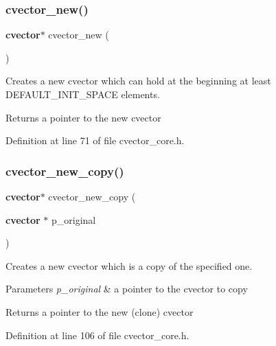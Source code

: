 \subsubsection{cvector\+\_\+new()}
{\footnotesize\ttfamily \textbf{ cvector}$\ast$ cvector\+\_\+new (\begin{DoxyParamCaption}{ }\end{DoxyParamCaption})}

Creates a new cvector which can hold at the beginning at least D\+E\+F\+A\+U\+L\+T\+\_\+\+I\+N\+I\+T\+\_\+\+S\+P\+A\+CE elements. \begin{DoxyReturn}{Returns}
a pointer to the new cvector 
\end{DoxyReturn}


Definition at line 71 of file cvector\+\_\+core.\+h.

\mbox{\label{cvector__interface_8h_a5106edfcb490caa0a6eb53e4be088fa7}} 
\subsubsection{cvector\+\_\+new\+\_\+copy()}
{\footnotesize\ttfamily \textbf{ cvector}$\ast$ cvector\+\_\+new\+\_\+copy (\begin{DoxyParamCaption}\item[{\textbf{ cvector} $\ast$}]{p\+\_\+original }\end{DoxyParamCaption})}

Creates a new cvector which is a copy of the specified one. 
\begin{DoxyParams}{Parameters}
{\em p\+\_\+original} & a pointer to the cvector to copy \\
\hline
\end{DoxyParams}
\begin{DoxyReturn}{Returns}
a pointer to the new (clone) cvector 
\end{DoxyReturn}


Definition at line 106 of file cvector\+\_\+core.\+h.

\mbox{\label{cvector__interface_8h_a8ae393983ad33cb1bc2df73f7d1db615}} 
